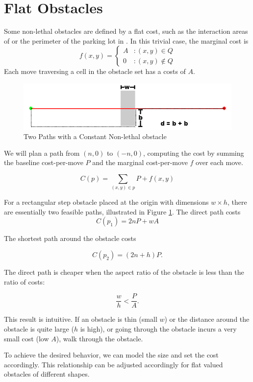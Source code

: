 \section{Flat Obstacles}
Some non-lethal obstacles are defined by a flat cost, such as the interaction areas of \citet{fraichard:anthronav} or the perimeter of the parking lot in \citet{likhachev:costmaps}. In this trivial case, the marginal cost is
\begin{equation}
   \displaystyle
   f(x, y) = \left\{
     \begin{array}{lr}
       A & : (x,y) \in Q\\
       0 & : (x,y) \notin Q
     \end{array}
   \right.
\end{equation}
Each move traversing a cell in the obstacle set has a costs of $A$. 

\begin{figure}[!t]
\includegraphics[width=\columnwidth]{graphix/Constant.png}
\caption{Two Paths with a Constant Non-lethal obstacle}
\label{fig:constant}
\end{figure}

We will plan a path from $(n, 0)$ to $(-n, 0)$, computing the cost by summing the baseline cost-per-move $P$ and the marginal cost-per-move $f$ over each move.

\begin{equation}
C(p) = \sum\limits_{(x,y)\in p} P + f(x, y)
\end{equation}

For a rectangular step obstacle placed at the origin with dimensions $w\times h$, there are essentially two feasible paths, illustrated in Figure \ref{fig:constant}. The direct path costs
\begin{equation}
C(p_1) = 2nP + wA
\end{equation}

The shortest path around the obstacle costs

\begin{equation}
C(p_2) = (2n + h)P.
\end{equation}

The direct path is cheaper when the aspect ratio of the obstacle  is less than the ratio of costs:

\begin{equation}
\frac{w}{h} < \frac{P}{A}.
\end{equation}

This result is intuitive. If an obstacle is thin (small $w$) or the distance around the obstacle is quite large ($h$ is high), or going through the obstacle incurs a very small cost (low $A$), walk through the obstacle. 

To achieve the desired behavior, we can model the size and set the cost accordingly. This relationship can be adjusted accordingly for flat valued obstacles of different shapes. 




